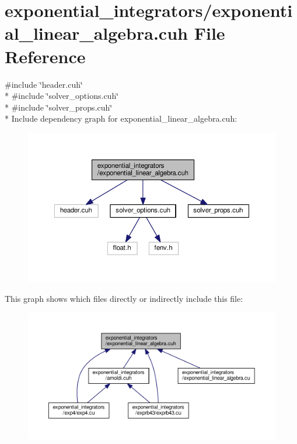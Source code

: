 \hypertarget{exponential__linear__algebra_8cuh}{}\section{exponential\+\_\+integrators/exponential\+\_\+linear\+\_\+algebra.cuh File Reference}
\label{exponential__linear__algebra_8cuh}
{\ttfamily \#include \char`\"{}header.\+cuh\char`\"{}}\\*
{\ttfamily \#include \char`\"{}solver\+\_\+options.\+cuh\char`\"{}}\\*
{\ttfamily \#include \char`\"{}solver\+\_\+props.\+cuh\char`\"{}}\\*
Include dependency graph for exponential\+\_\+linear\+\_\+algebra.\+cuh\+:\nopagebreak
\begin{figure}[H]
\begin{center}
\leavevmode
\includegraphics[width=350pt]{exponential__linear__algebra_8cuh__incl}
\end{center}
\end{figure}
This graph shows which files directly or indirectly include this file\+:\nopagebreak
\begin{figure}[H]
\begin{center}
\leavevmode
\includegraphics[width=350pt]{exponential__linear__algebra_8cuh__dep__incl}
\end{center}
\end{figure}
